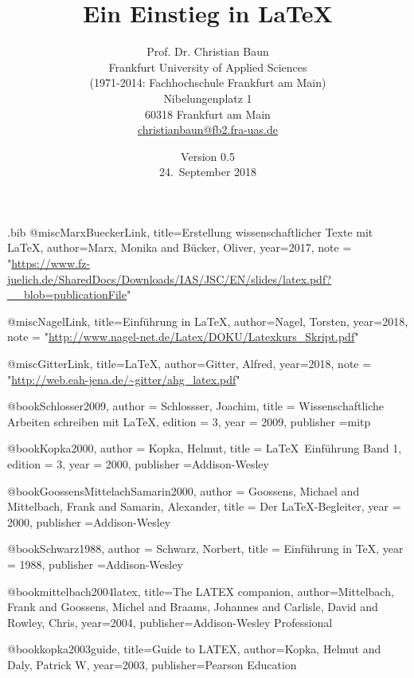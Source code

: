 \documentclass[a4paper,10pt,twoside]{scrbook}
\begin{document}
\begin{filecontents*}{\jobname.bib}
@misc{MarxBueckerLink,
	title={{Erstellung wissenschaftlicher Texte mit \LaTeX}},
	author={Marx, Monika and Bücker, Oliver},
	year={2017},
	note = "\url{https://www.fz-juelich.de/SharedDocs/Downloads/IAS/JSC/EN/slides/latex.pdf?__blob=publicationFile}"
}
   
@misc{NagelLink,
   	title={{Einführung in \LaTeX}},
   	author={Nagel, Torsten},
   	year={2018},
   	note = "\url{http://www.nagel-net.de/Latex/DOKU/Latexkurs_Skript.pdf}"
}

@misc{GitterLink,
	title={{\LaTeX}},
	author={Gitter, Alfred},
	year={2018},
	note = "\url{http://web.eah-jena.de/~gitter/ahg_latex.pdf}"
}

@book{Schlosser2009,
	author = {Schlossser, Joachim},
	title = {{Wissenschaftliche Arbeiten schreiben mit \LaTeX}},
	edition = {3},
	year = {2009},
	publisher ={mitp}
}


@book{Kopka2000,
	author = {Kopka, Helmut},
	title = {{\LaTeX\ Einführung Band 1}},
	edition = {3},
	year = {2000},
	publisher ={Addison-Wesley}
}


@book{GoossensMittelachSamarin2000,
	author = {Goossens, Michael and Mittelbach, Frank and Samarin, Alexander},
	title = {{Der \LaTeX-Begleiter}},
	year = {2000},
	publisher ={Addison-Wesley}
}


@book{Schwarz1988,
	author = {Schwarz, Norbert},
	title = {{Einführung in \TeX}},
	year = {1988},
    publisher ={Addison-Wesley}
}
  
@book{mittelbach2004latex,
	title={The LATEX companion},
	author={Mittelbach, Frank and Goossens, Michel and Braams, Johannes and Carlisle, David and Rowley, Chris},
	year={2004},
	publisher={Addison-Wesley Professional}
}

@book{kopka2003guide,
	title={Guide to LATEX},
	author={Kopka, Helmut and Daly, Patrick W},
	year={2003},
	publisher={Pearson Education}
}

\end{filecontents*}

\renewcommand{\arraystretch}{1}

\title{Ein Einstieg in \LaTeX}
\author{Prof. Dr. Christian Baun\\ Frankfurt University of Applied Sciences \\ (1971-2014: Fachhochschule Frankfurt am Main)\\
Nibelungenplatz 1 \\ 60318 Frankfurt am Main\\\url{christianbaun@fb2.fra-uas.de}\\[3em]}
\date{Version 0.5\\[3em] 24.~September 2018}
\end{document}
